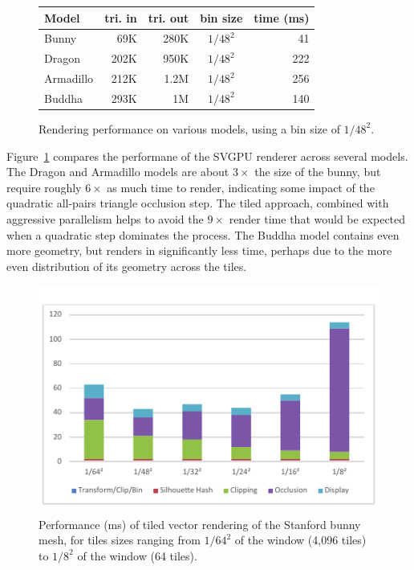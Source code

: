 \documentclass[review]{acmsiggraph}
\begin{document}
\begin{figure}
\begin{tabular}{|l|r|r|c|r|} \hline
\bf Model & \bf tri. in & \bf tri. out & \bf bin size & \bf time (ms) \\
\hline
Bunny & 69K & 280K & $1/48^2$ & 41 \\ 
Dragon & 202K & 950K & $1/48^2$ & 222 \\
Armadillo & 212K & 1.2M & $1/48^2$ & 256 \\
Buddha & 293K & 1M & $1/48^2$ & 140 \\ \hline
\end{tabular}
\caption{Rendering performance on various models, using a bin size of
$1/48^2.$}
\label{fig:modelperf}
\end{figure}

Figure~\ref{fig:modelperf} compares the performane of the SVGPU renderer
across several models. The Dragon and Armadillo models are about $3\times$ the
size of the bunny, but require roughly $6\times$ as much time to render,
indicating some impact of the quadratic all-pairs triangle occlusion step. The
tiled approach, combined with aggressive parallelism helps to avoid the
$9\times$ render time that would be expected when a quadratic step dominates
the process. The Buddha model contains even more geometry, but renders in
significantly less time, perhaps due to the more even distribution of its
geometry across the tiles.

\begin{figure} \centering
\includegraphics{images/binperf.pdf}
\caption{Performance (ms) of tiled vector rendering of the Stanford bunny mesh,
for tiles sizes ranging from $1/64^2$ of the window (4,096 tiles) to $1/8^2$ of
the window (64 tiles).}
\label{fig:binperf}
\end{figure}
\end{document}
